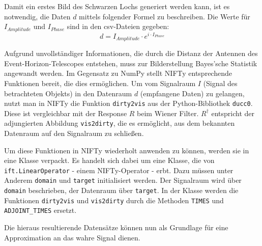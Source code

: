 Damit ein erstes Bild des Schwarzen Lochs generiert werden kann, ist es notwendig, die Daten $d$ mittels folgender Formel zu beschreiben. Die Werte für $I_{Amplitude}$ und $I_{Phase}$ sind in den csv-Dateien gegeben:
\[ d = I_{Amplitude} \cdot e^{i \cdot I_{Phase}} \]

Aufgrund unvollständiger Informationen, die durch die Distanz der Antennen des Event-Horizon-Telescopes entstehen, muss zur Bilderstellung Bayes'sche Statistik angewandt werden. Im Gegensatz zu NumPy stellt NIFTy entsprechende Funktionen bereit, die dies ermöglichen. Um vom Signalraum $I$ (Signal des betrachteten Objekts) in den Datenraum $d$ (empfangene Daten) zu gelangen, nutzt man in NIFTy die Funktion \verb|dirty2vis| aus der Python-Bibliothek \verb|ducc0|. Diese ist vergleichbar mit der Response $R$ beim Wiener Filter. $R^{\dagger}$ entspricht der adjungierten Abbildung \verb|vis2dirty|, die es ermöglicht, aus dem bekannten Datenraum auf den Signalraum zu schließen.

Um diese Funktionen in NIFTy wiederholt anwenden zu können, werden sie in eine Klasse verpackt. Es handelt sich dabei um eine Klasse, die von \verb|ift.LinearOperator| - einem NIFTy-Operator - erbt. Dazu müssen unter Anderem \verb|domain| und \verb|target| initialisiert werden. Der Signalraum wird über \verb|domain| beschrieben, der Datenraum über \verb|target|. In der Klasse werden die Funktionen \verb|dirty2vis| und \verb|vis2dirty| durch die Methoden \verb|TIMES| und \verb|ADJOINT_TIMES| ersetzt.

Die hieraus resultierende Datensätze können nun als Grundlage für eine Approximation an das wahre Signal dienen.
